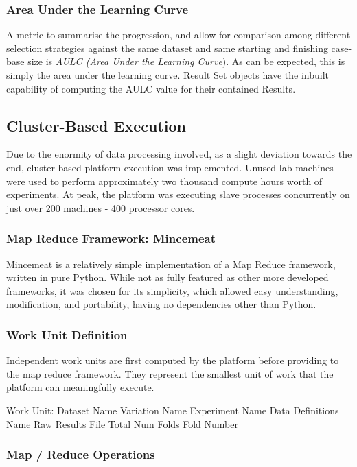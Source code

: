 \documentclass[a4paper,11pt]{report}
\begin{document}
\subsubsection{Area Under the Learning Curve}
A metric to summarise the progression, and allow for comparison among different selection strategies against the same dataset and same starting and finishing case-base size is \emph{AULC (Area Under the Learning Curve}). As can be expected, this is simply the area under the learning curve. Result Set objects have the inbuilt capability of computing the AULC value for their contained Results.

\subsection{Cluster-Based Execution}
Due to the enormity of data processing involved, as a slight deviation towards the end, cluster based platform execution was implemented. Unused lab machines were used to perform approximately two thousand compute hours worth of experiments. At peak, the platform was executing slave processes concurrently on just over 200 machines - 400 processor cores. 

\subsubsection{Map Reduce Framework: Mincemeat}
Mincemeat \citep{prog:mincemeat} is a relatively simple implementation of a Map Reduce framework, written in pure Python. While not as fully featured as other more developed frameworks, it was chosen for its simplicity, which allowed easy understanding, modification, and portability, having no dependencies other than Python.

\subsubsection{Work Unit Definition}
Independent work units are first computed by the platform before providing to the map reduce framework. They represent the smallest unit of work that the platform can meaningfully execute.

\begin{code}[numbers=none,frame=none] 
Work Unit:
  Dataset Name
  Variation Name
  Experiment Name
  Data Definitions Name
  Raw Results File
  Total Num Folds
  Fold Number
\end{code}

\subsubsection{Map / Reduce Operations}
\end{document}
